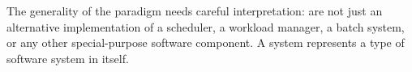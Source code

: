 \documentclass{sig-alternate}
\begin{document}
The generality of the \pilot paradigm needs careful interpretation: \pilots are
not just an alternative implementation of a scheduler, a workload manager, a
batch system, or any other special-purpose software component. A \pilot system
represents a type of software system in itself.




 





\end{document}
